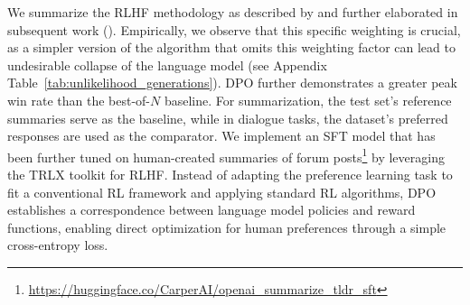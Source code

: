 We summarize the RLHF methodology as described by \citeauthor{ziegler2020finetuning} and further elaborated in subsequent work (\citep{stiennon2022learning, bai2022training, ouyang2022training}). Empirically, we observe that this specific weighting is crucial, as a simpler version of the algorithm that omits this weighting factor can lead to undesirable collapse of the language model (see Appendix Table~\ref{tab:unlikelihood_generations}). DPO further demonstrates a greater peak win rate than the best-of-$N$ baseline. For summarization, the test set’s reference summaries serve as the baseline, while in dialogue tasks, the dataset’s preferred responses are used as the comparator. We implement an SFT model that has been further tuned on human-created summaries of forum posts\footnote{\url{https://huggingface.co/CarperAI/openai_summarize_tldr_sft}} by leveraging the TRLX \citep{leandro_von_werra_2023_7790115} toolkit for RLHF. Instead of adapting the preference learning task to fit a conventional RL framework and applying standard RL algorithms, DPO establishes a correspondence between language model policies and reward functions, enabling direct optimization for human preferences through a simple cross-entropy loss. 
